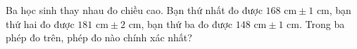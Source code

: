 \begin{ex}
Ba học sinh thay nhau đo chiều cao. Bạn thứ nhất đo được $168\text{ cm}\pm1\text{ cm}$, bạn thứ hai đo được $181\text{ cm}\pm2\text{ cm}$, bạn thứ ba đo được $148\text{ cm}\pm1\text{ cm}$. Trong ba phép đo trên, phép đo nào chính xác nhất?
\end{ex}
